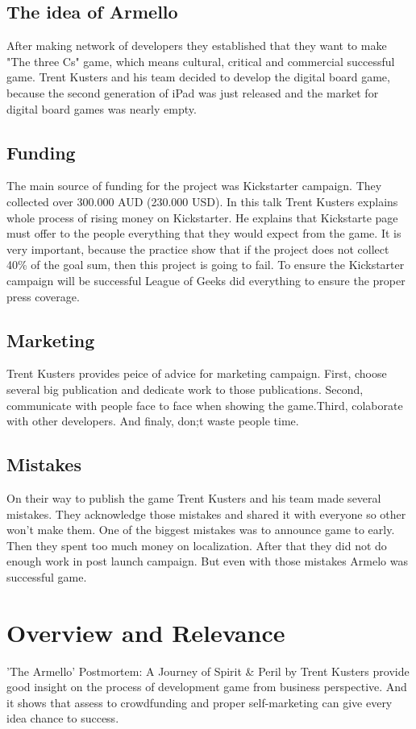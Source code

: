 \documentclass[a4paper]{article}
\begin{document}
\subsection{The idea of Armello}
After making network of developers they established that they want to make "The three Cs" game, which means cultural, critical and commercial successful game. Trent Kusters and his team decided to develop the digital board game, because the second generation of iPad was just released and the market for digital board games was nearly empty.

\subsection{Funding}
The main source of funding for the project was Kickstarter campaign. They collected over 300.000 AUD (230.000 USD). 
In this talk Trent Kusters explains whole process of rising money on Kickstarter. He explains that Kickstarte page must offer to the people everything that they would expect from the game. It is very important, because the practice show that if the project does not collect 40\% of the goal sum, then this project is going to fail. To ensure the Kickstarter campaign will be successful League of Geeks did everything to ensure the proper press coverage. 

\subsection{Marketing}
Trent Kusters provides peice of advice for marketing campaign. First, choose  several big publication and dedicate work to those publications. Second, communicate with people face to face when showing the game.Third, colaborate with other developers. And finaly, don;t waste people time.

\subsection{Mistakes}
On their way to publish the game Trent Kusters and his team made several mistakes. They acknowledge those mistakes and shared it with everyone so other won't make them.  One of the biggest mistakes was to announce game to early. Then they spent too much money on localization. After that they did not do enough work in post launch campaign. But even with those mistakes Armelo was successful game.

\section{Overview and Relevance}
'The Armello' Postmortem: A Journey of Spirit \& Peril by Trent Kusters provide good insight on the process of development game from business perspective. And it shows that assess to crowdfunding and proper self-marketing can give every idea chance to success.
\end{document}
